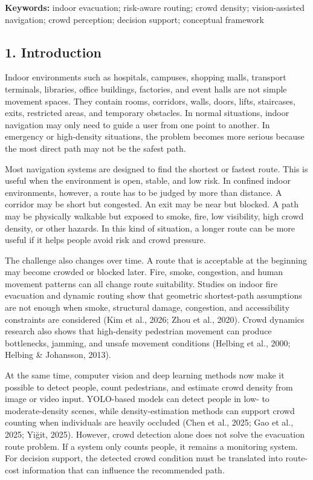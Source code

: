 \documentclass[
]{article}
\begin{document}
\textbf{Keywords:} indoor evacuation; risk-aware routing; crowd density;
vision-assisted navigation; crowd perception; decision support;
conceptual framework

\subsection{1. Introduction}\label{introduction}

Indoor environments such as hospitals, campuses, shopping malls,
transport terminals, libraries, office buildings, factories, and event
halls are not simple movement spaces. They contain rooms, corridors,
walls, doors, lifts, staircases, exits, restricted areas, and temporary
obstacles. In normal situations, indoor navigation may only need to
guide a user from one point to another. In emergency or high-density
situations, the problem becomes more serious because the most direct
path may not be the safest path.

Most navigation systems are designed to find the shortest or fastest
route. This is useful when the environment is open, stable, and low
risk. In confined indoor environments, however, a route has to be judged
by more than distance. A corridor may be short but congested. An exit
may be near but blocked. A path may be physically walkable but exposed
to smoke, fire, low visibility, high crowd density, or other hazards. In
this kind of situation, a longer route can be more useful if it helps
people avoid risk and crowd pressure.

The challenge also changes over time. A route that is acceptable at the
beginning may become crowded or blocked later. Fire, smoke, congestion,
and human movement patterns can all change route suitability. Studies on
indoor fire evacuation and dynamic routing show that geometric
shortest-path assumptions are not enough when smoke, structural damage,
congestion, and accessibility constraints are considered (Kim et al.,
2026; Zhou et al., 2020). Crowd dynamics research also shows that
high-density pedestrian movement can produce bottlenecks, jamming, and
unsafe movement conditions (Helbing et al., 2000; Helbing \& Johansson,
2013).

At the same time, computer vision and deep learning methods now make it
possible to detect people, count pedestrians, and estimate crowd density
from image or video input. YOLO-based models can detect people in low-
to moderate-density scenes, while density-estimation methods can support
crowd counting when individuals are heavily occluded (Chen et al., 2025;
Gao et al., 2025; Yiğit, 2025). However, crowd detection alone does not
solve the evacuation route problem. If a system only counts people, it
remains a monitoring system. For decision support, the detected crowd
condition must be translated into route-cost information that can
influence the recommended path.
\end{document}

